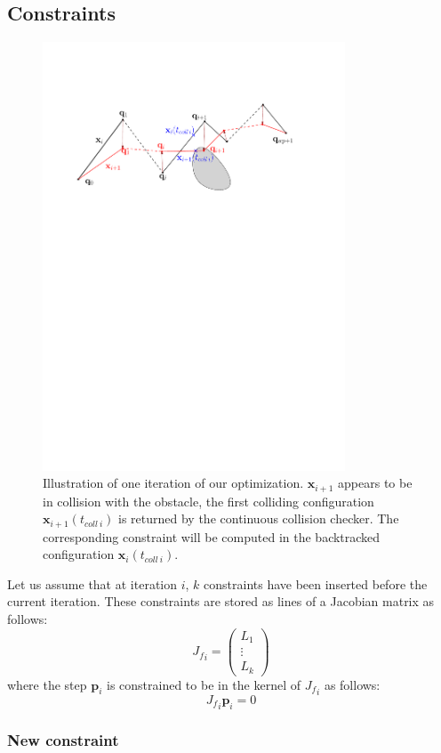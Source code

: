 \documentclass{tADR2e}
\newcommand\p{\mathbf{p}}
\newcommand\xx{\mathbf{x}} %
\newcommand\tcolli{t_{coll\ i}}
\newcommand\Jf{{J_f}}
\begin{document}
\subsection{Constraints}

\begin{figure}
	\centering
	\includegraphics[width=9cm]{optim_grad.pdf}
	\caption{Illustration of one iteration of our optimization. $\xx_{i+1}$ 
	appears 
	to be in collision with the obstacle, the first colliding configuration 
	$\xx_{i+1}(\tcolli)$ is returned by the continuous collision checker. The 
	corresponding constraint will be computed in the backtracked configuration 
	$\xx_{i}(\tcolli)$.}
	\label{optim_grad}
\end{figure}

Let us assume that at iteration $i$, $k$ constraints have been inserted before the current iteration. 
These constraints are stored as lines of a Jacobian matrix as follows:
$$
\Jf_{i} = \left(\begin{array}{c}L_1 \\ \vdots \\ L_k\end{array}\right)
$$
where the step $\p_i$ is constrained to be in the kernel of $\Jf_{i}$ as follows:
$$
\Jf_{i} \p_i = 0
$$

\subsubsection{New constraint}
\end{document}
